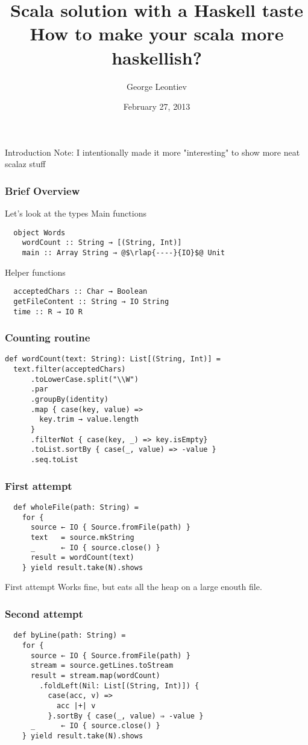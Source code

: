 \documentclass{beamer}
\title[Scala solution with a Haskell taste]{Scala solution with a Haskell taste\\How to make your scala more haskellish?}
\author{George Leontiev}
\institute{folone.info}
\date{February 27, 2013}
\begin{document}
\begin{frame}
\titlepage
\end{frame}


\begin{frame}{Introduction}
  Note: I intentionally made it more "interesting" to show more neat scalaz stuff
\end{frame}

\begin{frame}[fragile]
\frametitle{Brief Overview}
Let's look at the types\newline
\lstset{escapechar=\@}
Main functions
\begin{lstlisting}
  object Words
    wordCount :: String → [(String, Int)]
    main :: Array String → @$\rlap{----}{IO}$@ Unit
\end{lstlisting}
Helper functions
\begin{lstlisting}
  acceptedChars :: Char → Boolean
  getFileContent :: String → IO String
  time :: R → IO R
\end{lstlisting}
\end{frame}

\begin{frame}[fragile]
\frametitle{Counting routine}
\begin{lstlisting}
def wordCount(text: String): List[(String, Int)] =
  text.filter(acceptedChars)
      .toLowerCase.split("\\W")
      .par
      .groupBy(identity)
      .map { case(key, value) =>
        key.trim → value.length
      }
      .filterNot { case(key, _) => key.isEmpty}
      .toList.sortBy { case(_, value) => -value }
      .seq.toList
\end{lstlisting}
\end{frame}

\begin{frame}[fragile]
\frametitle{First attempt}
\begin{lstlisting}
  def wholeFile(path: String) =
    for {
      source ← IO { Source.fromFile(path) }
      text   = source.mkString
      _      ← IO { source.close() }
      result = wordCount(text)
    } yield result.take(N).shows
\end{lstlisting}
\end{frame}

\begin{frame}{First attempt}
  Works fine, but eats all the heap on a large enouth file.
\end{frame}

\begin{frame}[fragile]
\frametitle{Second attempt}
\begin{lstlisting}
  def byLine(path: String) =
    for {
      source ← IO { Source.fromFile(path) }
      stream = source.getLines.toStream
      result = stream.map(wordCount)
        .foldLeft(Nil: List[(String, Int)]) {
          case(acc, v) =>
            acc |+| v
          }.sortBy { case(_, value) ⇒ -value }
      _      ← IO { source.close() }
    } yield result.take(N).shows
\end{lstlisting}
\end{frame}
\end{document}

